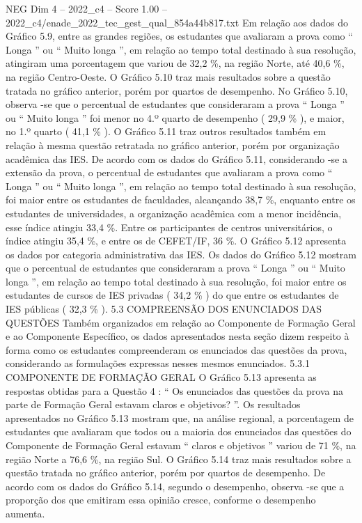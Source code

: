 \begin{textsample}{NEG Dim 4 – 2022\_c4 – Score 1.00 – 2022\_c4/enade\_2022\_tec\_gest\_qual\_854a44b817.txt}
Em relação aos dados do Gráfico 5.9, entre as grandes regiões, os estudantes que avaliaram a prova como “ Longa ” ou “ Muito longa ”, em relação ao tempo total destinado à sua resolução, atingiram uma porcentagem que variou de 32,2 \%, na região Norte, até 40,6 \%, na região Centro-Oeste.
O Gráfico 5.10 traz mais resultados sobre a questão tratada no gráfico anterior, porém por quartos de desempenho.
No Gráfico 5.10, observa -se que o percentual de estudantes que consideraram a prova “ Longa ” ou “ Muito longa ” foi menor no 4.º quarto de desempenho ( 29,9 \% ), e maior, no 1.º quarto ( 41,1 \% ).
O Gráfico 5.11 traz outros resultados também em relação à mesma questão retratada no gráfico anterior, porém por organização acadêmica das IES.
De acordo com os dados do Gráfico 5.11, considerando -se a extensão da prova, o percentual de estudantes que avaliaram a prova como “ Longa ” ou “ Muito longa ”, em relação ao tempo total destinado à sua resolução, foi maior entre os estudantes de faculdades, alcançando 38,7 \%, enquanto entre os estudantes de universidades, a organização acadêmica com a menor incidência, esse índice atingiu 33,4 \%.
Entre os participantes de centros universitários, o índice atingiu 35,4 \%, e entre os de CEFET/IF, 36 \%.
O Gráfico 5.12 apresenta os dados por categoria administrativa das IES.
Os dados do Gráfico 5.12 mostram que o percentual de estudantes que consideraram a prova “ Longa ” ou “ Muito longa ”, em relação ao tempo total destinado à sua resolução, foi maior entre os estudantes de cursos de IES privadas ( 34,2 \% ) do que entre os estudantes de IES públicas ( 32,3 \% ). 5.3 COMPREENSÃO DOS ENUNCIADOS DAS QUESTÕES Também organizados em relação ao Componente de Formação Geral e ao Componente Específico, os dados apresentados nesta seção dizem respeito à forma como os estudantes compreenderam os enunciados das questões da prova, considerando as formulações expressas nesses mesmos enunciados. 5.3.1 COMPONENTE DE FORMAÇÃO GERAL O Gráfico 5.13 apresenta as respostas obtidas para a Questão 4 : “ Os enunciados das questões da prova na parte de Formação Geral estavam claros e objetivos? ”.
Os resultados apresentados no Gráfico 5.13 mostram que, na análise regional, a porcentagem de estudantes que avaliaram que todos ou a maioria dos enunciados das questões do Componente de Formação Geral estavam “ claros e objetivos ” variou de 71 \%, na região Norte a 76,6 \%, na região Sul.
O Gráfico 5.14 traz mais resultados sobre a questão tratada no gráfico anterior, porém por quartos de desempenho.
De acordo com os dados do Gráfico 5.14, segundo o desempenho, observa -se que a proporção dos que emitiram essa opinião cresce, conforme o desempenho aumenta.

\end{textsample}
